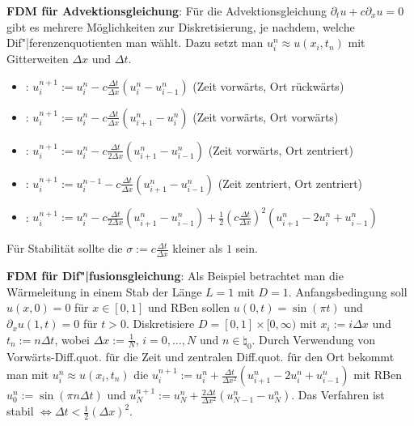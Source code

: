 \linie

\textbf{FDM für Advektionsgleichung}:
Für die Advektionsgleichung $\partial_t u + c \partial_x u = 0$ gibt es mehrere
Möglichkeiten zur Diskretisierung, je nachdem, welche Dif"|ferenzenquotienten man wählt.
Dazu setzt man $u_i^n \approx u(x_i, t_n)$ mit Gitterweiten $\Delta x$ und $\Delta t$.
\begin{itemize}
    \item
    :
    $u_i^{n+1} := u_i^n - c \frac{\Delta t}{\Delta x} (u_i^n - u_{i-1}^n)$
    (Zeit vorwärts, Ort rückwärts)
    
    \item
    :
    $u_i^{n+1} := u_i^n - c \frac{\Delta t}{\Delta x} (u_{i+1}^n - u_i^n)$
    (Zeit vorwärts, Ort vorwärts)
    
    \item
    :
    $u_i^{n+1} := u_i^n - c \frac{\Delta t}{2 \Delta x} (u_{i+1}^n - u_{i-1}^n)$
    (Zeit vorwärts, Ort zentriert)
    
    \item
    :
    $u_i^{n+1} := u_i^{n-1} - c \frac{\Delta t}{\Delta x} (u_{i+1}^n - u_{i-1}^n)$
    (Zeit zentriert, Ort zentriert)
    
    \item
    :
    $u_i^{n+1} := u_i^n - c \frac{\Delta t}{2 \Delta x} (u_{i+1}^n - u_{i-1}^n) +
    \frac{1}{2} (c \frac{\Delta t}{\Delta x})^2 (u_{i+1}^n - 2u_i^n + u_{i-1}^n)$
\end{itemize}
Für Stabilität sollte die 
$\sigma := c \frac{\Delta t}{\Delta x}$ kleiner als $1$ sein.

\linie

\textbf{FDM für Dif"|fusionsgleichung}:
Als Beispiel betrachtet man die Wärmeleitung in einem Stab der Länge $L = 1$ mit $D = 1$.
Anfangsbedingung soll $u(x, 0) = 0$ für $x \in [0, 1]$ und
RBen sollen $u(0, t) = \sin(\pi t)$ und $\partial_x u(1, t) = 0$ für $t > 0$.
Diskretisiere $D = [0, 1] \times [0, \infty)$ mit $x_i := i \Delta x$ und $t_n := n \Delta t$,
wobei $\Delta x := \frac{1}{N}$, $i = 0, \dotsc, N$ und $n \in \natural_0$.
Durch Verwendung von Vorwärts-Diff.quot. für die Zeit und zentralen Diff.quot. für den Ort
bekommt man mit $u_i^n \approx u(x_i, t_n)$ die 
$u_i^{n+1} := u_i^n + \frac{\Delta t}{\Delta x^2} (u_{i+1}^n - 2u_i^n + u_{i-1}^n)$
mit RBen $u_0^n := \sin(\pi n \Delta t)$ und
$u_N^{n+1} := u_N^n + \frac{2\Delta t}{\Delta x^2} (u_{N-1}^n - u_N^n)$.
Das Verfahren ist stabil $\iff \Delta t < \frac{1}{2} (\Delta x)^2$.

